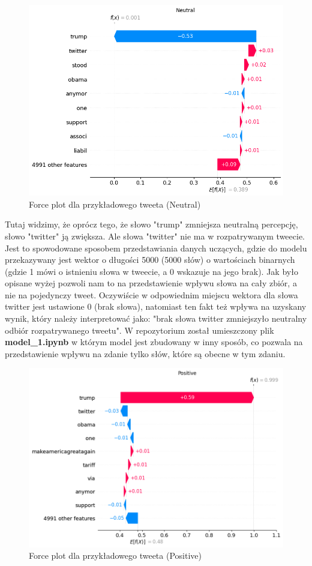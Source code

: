 \documentclass{article}
\begin{document}
\begin{figure}[H]
    \centering
    \includegraphics[width=\textwidth]{assets/force_2_neutral.png}
    \caption{Force plot dla przykładowego tweeta (Neutral)}
\end{figure}

\noindent Tutaj widzimy, że oprócz tego, że słowo "trump" zmniejsza neutralną percepcję, słowo "twitter" ją zwiększa. Ale słowa "twitter" nie ma w rozpatrywanym tweecie. Jest to spowodowane sposobem przedstawiania danych uczących, gdzie do modelu przekazywany jest wektor o długości 5000 (5000 słów) o wartościach binarnych (gdzie 1 mówi o istnieniu słowa w tweecie, a 0 wskazuje na jego brak). Jak było opisane wyżej pozwoli nam to na przedstawienie wpływu słowa na cały zbiór, a nie na pojedynczy tweet. Oczywiście w odpowiednim miejscu wektora dla słowa twitter jest ustawione 0 (brak słowa), natomiast ten fakt też wpływa na uzyskany wynik, który należy interpretować jako: "brak słowa twitter zmniejszyło neutralny odbiór rozpatrywanego tweetu". W repozytorium został umieszczony plik \textbf{model\_1.ipynb} w którym model jest zbudowany w inny sposób, co pozwala na przedstawienie wpływu na zdanie tylko słów, które są obecne w tym zdaniu.

\begin{figure}[H]
    \centering
    \includegraphics[width=\textwidth]{assets/force_2_positive.png}
    \caption{Force plot dla przykładowego tweeta (Positive)}
\end{figure}
\end{document}
